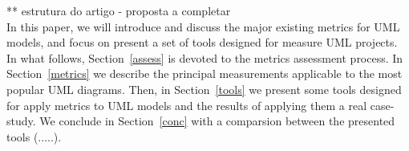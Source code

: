   ** estrutura do artigo - proposta a completar\\
  
In this paper, we will introduce and discuss the major existing metrics for UML models, and focus on present a set of tools designed for measure UML projects.
In what follows, Section~\ref{assess} is devoted to the metrics assessment process.
In Section~\ref{metrics} we describe the principal measurements applicable to the most popular UML diagrams.
Then, in Section~\ref{tools} we present some tools designed for apply metrics to UML models and the results of applying them a real case-study.
We conclude in Section~\ref{conc} with a comparsion between the presented tools (.....).
  
    


